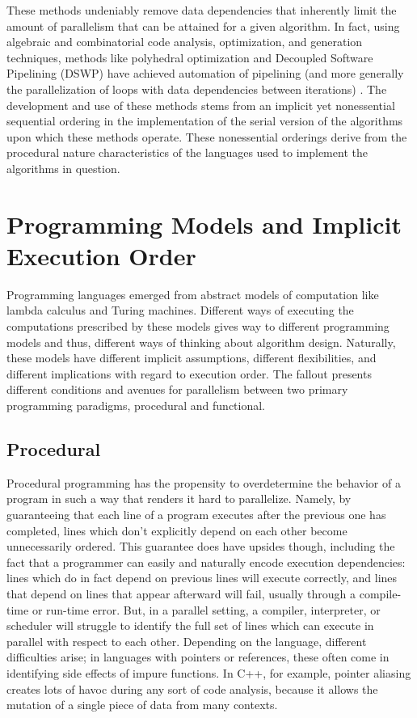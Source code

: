 These methods undeniably remove data dependencies that inherently limit the
amount of parallelism that can be attained for a given algorithm. In fact, using
algebraic and combinatorial code analysis, optimization, and generation
techniques, methods like polyhedral optimization and Decoupled Software
Pipelining (DSWP) have achieved automation of pipelining (and more generally the
parallelization of loops with data dependencies between iterations)
\cite{polyopt} \cite{dswp}. The development and use of these methods stems from
an implicit yet nonessential sequential ordering in the implementation of the
serial version of the algorithms upon which these methods operate. These
nonessential orderings derive from the procedural nature characteristics of the
languages used to implement the algorithms in question.

\section{Programming Models and Implicit Execution Order}
Programming languages emerged from abstract models of computation like lambda
calculus and Turing machines. Different ways of executing the computations
prescribed by these models gives way to different programming models and thus,
different ways of thinking about algorithm design. Naturally, these models have
different implicit assumptions, different flexibilities, and different
implications with regard to execution order. The fallout presents different
conditions and avenues for parallelism between two primary programming
paradigms, procedural and functional.

\subsection{Procedural}
Procedural programming has the propensity to overdetermine the behavior of a
program in such a way that renders it hard to parallelize. Namely, by
guaranteeing that each line of a program executes after the previous one has
completed, lines which don't explicitly depend on each other become
unnecessarily ordered. This guarantee does have upsides though, including the
fact that a programmer can easily and naturally encode execution dependencies:
lines which do in fact depend on previous lines will execute correctly, and
lines that depend on lines that appear afterward will fail, usually through a
compile-time or run-time error. But, in a parallel setting, a compiler,
interpreter, or scheduler will struggle to identify the full set of lines which
can execute in parallel with respect to each other. Depending on the language,
different difficulties arise; in languages with pointers or references, these
often come in identifying side effects of impure functions. In C++, for example,
pointer aliasing creates lots of havoc during any sort of code analysis, because
it allows the mutation of a single piece of data from many contexts.

